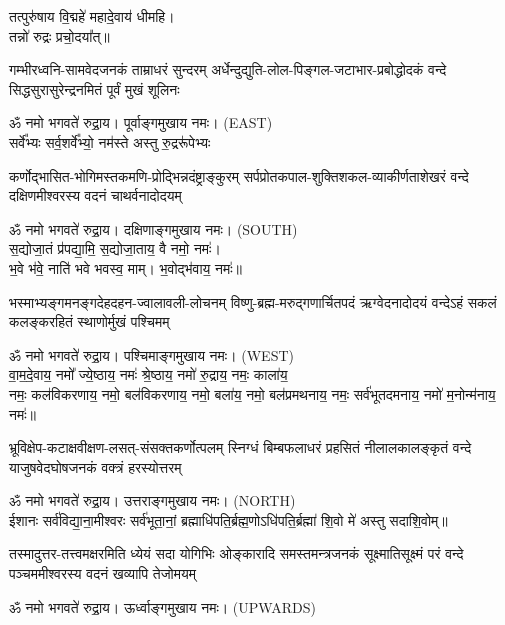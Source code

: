 {\small\closesection}

\begin{center}
तत्पुरु॑षाय वि॒द्महे॑ महादे॒वाय॑ धीमहि।\\
तन्नो॑ रुद्रः प्रचो॒दया᳚त्॥

{गम्भीरध्वनि-सामवेदजनकं ताम्राधरं सुन्दरम्}
{अर्धेन्दुद्युति-लोल-पिङ्गल-जटाभार-प्रबोद्धोदकं}
{वन्दे सिद्धसुरासुरेन्द्रनमितं पूर्वं मुखं शूलिनः}

ॐ नमो भगवते॑ रुद्रा॒य। पूर्वाङ्गमुखाय नमः। {\scriptsize (EAST)}\\[1em]

{सर्वे᳚भ्यः सर्व॒शर्वे᳚भ्यो॒ नम॑स्ते अस्तु रु॒द्ररू॑पेभ्यः}

{कर्णोद्भासित-भोगिमस्तकमणि-प्रोद्भिन्नदंष्ट्राङ्कुरम्}
{सर्पप्रोतकपाल-शुक्तिशकल-व्याकीर्णताशेखरं}
{वन्दे दक्षिणमीश्वरस्य वदनं चाथर्वनादोदयम्}

ॐ नमो भगवते॑ रुद्रा॒य। दक्षिणाङ्गमुखाय नमः। {\scriptsize (SOUTH)}\\[1em]

स॒द्योजा॒तं प्र॑पद्या॒मि॒ स॒द्योजा॒ताय॒ वै नमो॒ नमः॑।\\
भ॒वे भ॑वे॒ नाति॑ भवे भवस्व॒ माम्। भ॒वोद्भ॑वाय॒ नमः॑॥

{भस्माभ्यङ्गमनङ्गदेहदहन-ज्वालावली-लोचनम्}
{विष्णु-ब्रह्म-मरुद्गणार्चितपदं ऋग्वेदनादोदयं}
{वन्देऽहं सकलं कलङ्करहितं स्थाणोर्मुखं पश्चिमम्}

ॐ नमो भगवते॑ रुद्रा॒य। पश्चिमाङ्गमुखाय नमः। {\scriptsize (WEST)}\\[1em]

वा॒म॒दे॒वाय॒ नमो᳚ ज्ये॒ष्ठाय॒ नमः॑ श्रे॒ष्ठाय॒ नमो॑ रु॒द्राय॒ नमः॒ काला॑य॒\\ नमः॒ कल॑विकरणाय॒ नमो॒ बल॑विकरणाय॒ नमो॒ बला॑य॒ नमो॒ बल॑प्रमथनाय॒ नमः॒ सर्व॑भूतदमनाय॒ नमो॑ म॒नोन्म॑नाय॒ नमः॑॥

{भ्रूविक्षेप-कटाक्षवीक्षण-लसत्-संसक्तकर्णोत्पलम्}
{स्निग्धं बिम्बफलाधरं प्रहसितं नीलालकालङ्कृतं}
{वन्दे याजुषवेदघोषजनकं वक्त्रं हरस्योत्तरम्}

ॐ नमो भगवते॑ रुद्रा॒य। उत्तराङ्गमुखाय नमः। {\scriptsize (NORTH)}\\[1em]

ईशानः सर्व॑विद्या॒ना॒मीश्वरः सर्व॑भूता॒नां॒ ब्रह्माधि॑पति॒र्ब्रह्म॒णोऽधि॑पति॒र्ब्रह्मा॑ शि॒वो मे॑ अस्तु सदाशि॒वोम्॥

{तस्मादुत्तर-तत्त्वमक्षरमिति ध्येयं सदा योगिभिः}
{ओङ्कारादि समस्तमन्त्रजनकं सूक्ष्मातिसूक्ष्मं परं}
{वन्दे पञ्चममीश्वरस्य वदनं खव्यापि तेजोमयम्}

ॐ नमो भगवते॑ रुद्रा॒य। ऊर्ध्वाङ्गमुखाय नमः। {\scriptsize (UPWARDS)}\\[1em]

\end{center}

